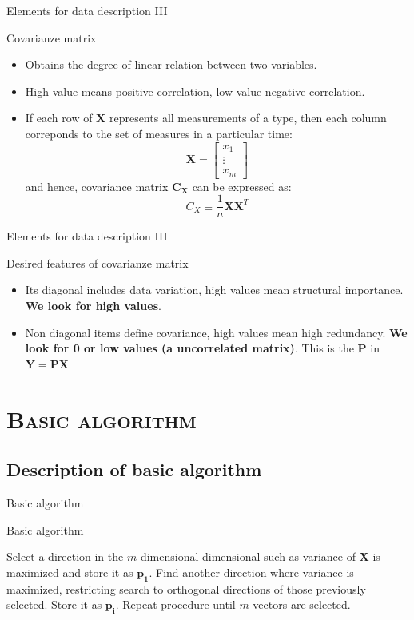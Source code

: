 \documentclass[xcolor=x11names,compress,10pt]{beamer}
\renewcommand{\(}{\begin{columns}}
\renewcommand{\)}{\end{columns}}
\newcommand{\<}[1]{\begin{column}{#1}}
\renewcommand{\>}{\end{column}}
\begin{document}
\begin{frame}{Elements for data description III}
\begin{block}{Covarianze matrix}
\begin{itemize}
	\item Obtains the degree of linear relation between two variables.
	\item High value means positive correlation, low value negative correlation.
	\item If each row of  $\mathbf{X}$ represents all measurements of a type, then each column correponds to the set of measures in a particular time:
$$
\mathbf{X} = 
\begin{bmatrix}
x_1 \\
\vdots \\
x_m
\end{bmatrix}
$$
and hence, covariance matrix $\mathbf{C_X}$ can be expressed as:
$$
C_X \equiv \frac{1}{n}\mathbf{XX}^T
$$
\end{itemize}
\end{block}
\end{frame}

\begin{frame}{Elements for data description III}
\begin{block}{Desired features of covarianze matrix}
\begin{itemize}
	\item Its diagonal includes data variation, high values mean structural importance. \textbf{We look for high values}.
	\item Non diagonal items define covariance, high values mean high redundancy. \textbf{We look for 0 or low values (a uncorrelated matrix)}.
	This is the $\mathbf{P}$ in $\mathbf{Y} = \mathbf{PX}$
\end{itemize}
\end{block}
\end{frame}


\section{\scshape Basic algorithm}
\subsection{Description of basic algorithm}
\begin{frame}{Basic algorithm}
\begin{block}{Basic algorithm}

\begin{algorithmic}[1] 
\STATE Select a direction in the $m$-dimensional dimensional such as variance of $\mathbf{X}$ is maximized and store it as $\mathbf{p_1}$.
\STATE Find another direction where variance is maximized, restricting search to orthogonal directions of those previously selected. Store it as $\mathbf{p_i}$.
\STATE Repeat procedure until $m$ vectors are selected.
\end{algorithmic} 
\end{block}
\end{frame}
\end{document}
